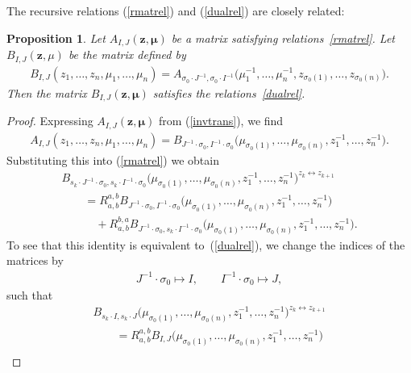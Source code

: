 \documentclass[pdftex]{sigma}
\def\zz{{\boldsymbol z}}
\def\mub{{\boldsymbol\mu}}
\numberwithin{equation}{section}
\newtheorem{Proposition}[Theorem]{Proposition}
 { \theoremstyle{definition}
\newtheorem{Definition}[Theorem]{Definition}
\newtheorem{Note}[Theorem]{Note}
\newtheorem{Example}[Theorem]{Example}
\newtheorem{Remark}[Theorem]{Remark} }
\begin{document}
The recursive relations (\ref{rmatrel}) and (\ref{dualrel}) are closely related:

\begin{Proposition} \label{prop1} Let $A_{I,J}(\zz,\mub)$ be a matrix satisfying relations~\eqref{rmatrel}. Let $B_{I,J}(\zz,\mu)$ be the matrix defined by
\begin{gather} \label{invtrans}
B_{I,J}(z_1,\dots, z_n,\mu_1,\dots,\mu_n)=A_{\sigma_{0}\cdot J^{-1},\sigma_{0}\cdot I^{-1}}\big(\mu_1^{-1},\dots,\mu_{n}^{-1},z_{\sigma_{0}(1)},\dots,z_{\sigma_{0}(n)}\big).
\end{gather}
Then the matrix $B_{I,J}(\zz,\mub)$ satisfies the relations~\eqref{dualrel}.
\end{Proposition}
\begin{proof}Expressing $A_{I,J}(\zz,\mub)$ from (\ref{invtrans}), we find
\begin{gather*}
A_{I,J}(z_1,\dots,z_{n},\mu_{1},\dots,\mu_{n}) = B_{J^{-1}\cdot \sigma_{0},I^{-1}\cdot \sigma_{0}}\big(\mu_{\sigma_{0}(1)},\dots,\mu_{\sigma_{0}(n)},z^{-1}_1,\dots, z_{n}^{-1}\big).
\end{gather*}
Substituting this into (\ref{rmatrel}) we obtain
\begin{gather*}
B_{s_k\cdot J^{-1} \cdot \sigma_{0},s_k\cdot I^{-1} \cdot \sigma_{0}}\big(\mu_{\sigma_{0}(1)},\dots,\mu_{\sigma_{0}(n)},z_{1}^{-1},\dots, z_{n}^{-1}\big)^{z_{k}\leftrightarrow z_{k+1}}\\
\qquad {}= R^{a,b}_{a,b} B_{J^{-1}\cdot \sigma_{0},I^{-1} \cdot \sigma_{0}}\big(\mu_{\sigma_{0}(1)},\dots,\mu_{\sigma_{0}(n)},z_{1}^{-1},\dots, z_{n}^{-1}\big)\\
\qquad \quad {} + R^{b,a}_{a,b} B_{J^{-1}\cdot \sigma_{0},s_k \cdot I^{-1} \cdot \sigma_{0}}\big(\mu_{\sigma_{0}(1)},\dots,\mu_{\sigma_{0}(n)},z_{1}^{-1},\dots, z_{n}^{-1}\big).
\end{gather*}
To see that this identity is equivalent to~(\ref{dualrel}), we change the indices of the matrices by
\begin{gather} \label{DualPoint}
J^{-1}\cdot \sigma_{0}\mapsto I, \qquad I^{-1}\cdot \sigma_{0}\mapsto J,
\end{gather}
such that
\begin{gather*}
 B_{s_k \cdot I ,s_k\cdot J }\big(\mu_{\sigma_{0}(1)},\dots,\mu_{\sigma_{0}(n)},z_{1}^{-1},\dots, z_{n}^{-1}\big)^{z_{k}\leftrightarrow z_{k+1}}\\
 \qquad{} =
 R^{a,b}_{a,b} B_{I,J}\big(\mu_{\sigma_{0}(1)},\dots,\mu_{\sigma_{0}(n)},z_{1}^{-1},\dots, z_{n}^{-1}\big)\\

\end{gather*}
\end{proof}
\end{document}
